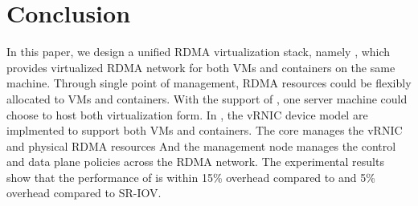 \section{Conclusion} \label{conclusion}
In this paper, we design a unified RDMA virtualization stack, namely \sys, which provides virtualized RDMA network for both VMs and containers on the same machine.
Through single point of management, RDMA resources could be flexibly allocated to VMs and containers. With the support of \sys, one server machine could choose to host both virtualization form.
In \sys, the vRNIC device model are implmented to support both VMs and containers. The \sys core manages the vRNIC and physical RDMA resources And the management node manages the control and data plane policies across the RDMA network. The experimental results show that the performance of \sys is within 15\% overhead compared to \native and 5\% overhead compared to SR-IOV.